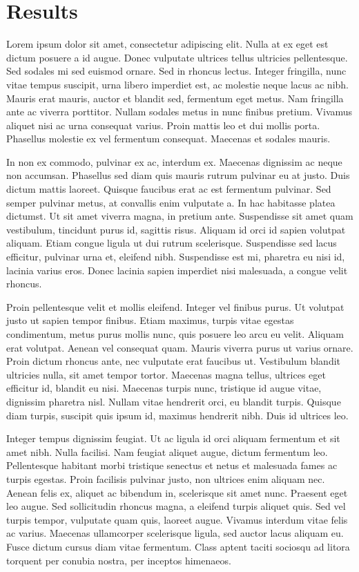 
\chapter{Results}

Lorem ipsum dolor sit amet, consectetur adipiscing elit. Nulla at ex eget est dictum posuere a id augue. Donec vulputate ultrices tellus ultricies pellentesque. Sed sodales mi sed euismod ornare. Sed in rhoncus lectus. Integer fringilla, nunc vitae tempus suscipit, urna libero imperdiet est, ac molestie neque lacus ac nibh. Mauris erat mauris, auctor et blandit sed, fermentum eget metus. Nam fringilla ante ac viverra porttitor. Nullam sodales metus in nunc finibus pretium. Vivamus aliquet nisi ac urna consequat varius. Proin mattis leo et dui mollis porta. Phasellus molestie ex vel fermentum consequat. Maecenas et sodales mauris.

In non ex commodo, pulvinar ex ac, interdum ex. Maecenas dignissim ac neque non accumsan. Phasellus sed diam quis mauris rutrum pulvinar eu at justo. Duis dictum mattis laoreet. Quisque faucibus erat ac est fermentum pulvinar. Sed semper pulvinar metus, at convallis enim vulputate a. In hac habitasse platea dictumst. Ut sit amet viverra magna, in pretium ante. Suspendisse sit amet quam vestibulum, tincidunt purus id, sagittis risus. Aliquam id orci id sapien volutpat aliquam. Etiam congue ligula ut dui rutrum scelerisque. Suspendisse sed lacus efficitur, pulvinar urna et, eleifend nibh. Suspendisse est mi, pharetra eu nisi id, lacinia varius eros. Donec lacinia sapien imperdiet nisi malesuada, a congue velit rhoncus.

Proin pellentesque velit et mollis eleifend. Integer vel finibus purus. Ut volutpat justo ut sapien tempor finibus. Etiam maximus, turpis vitae egestas condimentum, metus purus mollis nunc, quis posuere leo arcu eu velit. Aliquam erat volutpat. Aenean vel consequat quam. Mauris viverra purus ut varius ornare. Proin dictum rhoncus ante, nec vulputate erat faucibus ut. Vestibulum blandit ultricies nulla, sit amet tempor tortor. Maecenas magna tellus, ultrices eget efficitur id, blandit eu nisi. Maecenas turpis nunc, tristique id augue vitae, dignissim pharetra nisl. Nullam vitae hendrerit orci, eu blandit turpis. Quisque diam turpis, suscipit quis ipsum id, maximus hendrerit nibh. Duis id ultrices leo.

Integer tempus dignissim feugiat. Ut ac ligula id orci aliquam fermentum et sit amet nibh. Nulla facilisi. Nam feugiat aliquet augue, dictum fermentum leo. Pellentesque habitant morbi tristique senectus et netus et malesuada fames ac turpis egestas. Proin facilisis pulvinar justo, non ultrices enim aliquam nec. Aenean felis ex, aliquet ac bibendum in, scelerisque sit amet nunc. Praesent eget leo augue. Sed sollicitudin rhoncus magna, a eleifend turpis aliquet quis. Sed vel turpis tempor, vulputate quam quis, laoreet augue. Vivamus interdum vitae felis ac varius. Maecenas ullamcorper scelerisque ligula, sed auctor lacus aliquam eu. Fusce dictum cursus diam vitae fermentum. Class aptent taciti sociosqu ad litora torquent per conubia nostra, per inceptos himenaeos.

